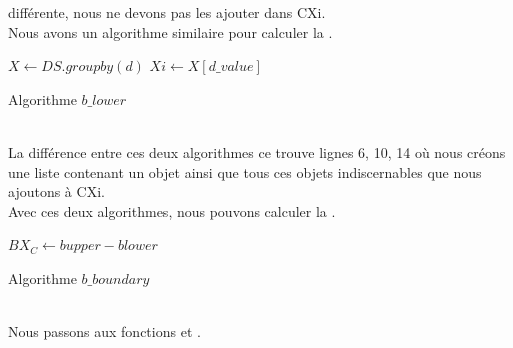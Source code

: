 différente, nous ne devons pas les ajouter dans CXi. \\
Nous avons un algorithme similaire pour calculer la \blower. \\
\begin{algorithm}[h!]
	\SetAlgoLined
	\LinesNumbered
	$X \gets DS.groupby(d)$\;
	$Xi \gets X[d\_value]$\;
	\caption{Algorithme $b\_lower$}
\end{algorithm} \\
La différence entre ces deux algorithmes ce trouve lignes 6, 10, 14 où
nous créons une liste contenant un objet ainsi que tous ces objets
indiscernables que nous ajoutons à CXi. \\
\newpage
Avec ces deux algorithmes, nous pouvons calculer la \bboundary. \\
\begin{algorithm}[h!]
	\SetAlgoLined
	\LinesNumbered
	$BX_C \gets bupper - blower$ \;
	\caption{Algorithme $b\_boundary$}
\end{algorithm} \\
Nous passons aux fonctions \posreg et \negreg.
